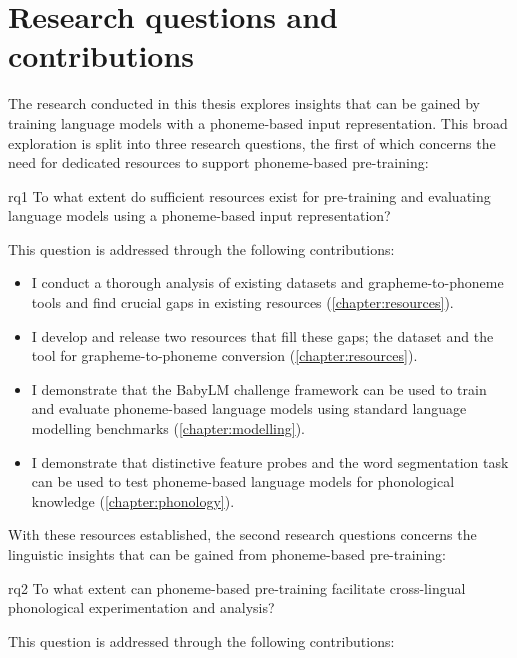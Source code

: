 \section{Research questions and contributions}

The research conducted in this thesis explores insights that can be gained by training language models with a phoneme-based input representation. This broad exploration is split into three research questions, the first of which concerns the need for dedicated resources to support phoneme-based pre-training:

\begin{question}{}{rq1}
    To what extent do sufficient resources exist for pre-training and evaluating language models using a phoneme-based input representation?
\end{question}

This question is addressed through the following contributions:

\begin{itemize}
    \item I conduct a thorough analysis of existing datasets and grapheme-to-phoneme tools and find crucial gaps in existing resources (\cref{chapter:resources}).
    \item I develop and release two resources that fill these gaps; the \ipachildes dataset and the \gpp tool for grapheme-to-phoneme conversion (\cref{chapter:resources}).
    \item I demonstrate that the BabyLM challenge framework can be used to train and evaluate phoneme-based language models using standard language modelling benchmarks (\cref{chapter:modelling}).
    \item I demonstrate that distinctive feature probes and the word segmentation task can be used to test phoneme-based language models for phonological knowledge (\cref{chapter:phonology}).
\end{itemize}

With these resources established, the second research questions concerns the linguistic insights that can be gained from phoneme-based pre-training:

\begin{question}{}{rq2}
    To what extent can phoneme-based pre-training facilitate cross-lingual phonological experimentation and analysis?
\end{question}

This question is addressed through the following contributions:

